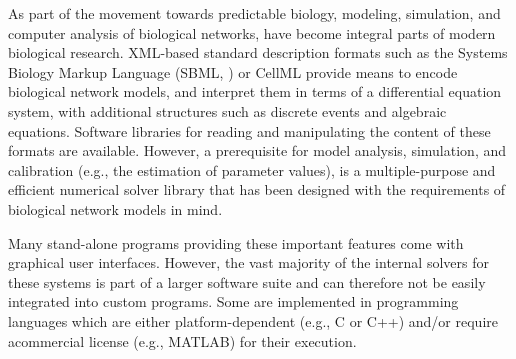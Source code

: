 \documentclass{bioinfo}
\begin{document}
As part of the movement towards predictable biology, modeling, 
simulation, and computer analysis of biological networks, have become integral
parts of modern biological research. XML-based standard description formats
such as the Systems Biology Markup Language (SBML, \citealt{Hucka2004}) or
CellML \citep{Lloyd2004} provide means to encode biological network models, and
interpret them in terms of a differential equation system, with additional
structures such as discrete events and algebraic equations.
Software libraries for reading and manipulating the content of
these formats are available.
However, a prerequisite for model analysis, simulation, and calibration (e.g., the
estimation of parameter values), is a multiple-purpose and 
efficient numerical solver library that has been designed with the
requirements of biological network models in mind.

Many stand-alone programs providing these important features come with
graphical user interfaces.
However, the vast majority of the internal solvers for
these systems is part of a larger software suite and can therefore not
be easily integrated into custom programs. Some are implemented in programming
languages which are either platform-dependent (e.g., C or C++) and/or require
acommercial license (e.g., MATLAB\texttrademark{}) for their execution.
%
%
%
\end{document}

